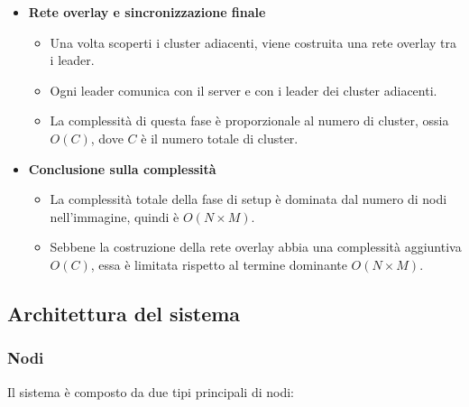 \documentclass[12pt, a4paper]{report}
\begin{document}
\begin{itemize}
    \item \textbf{Rete overlay e sincronizzazione finale}
    \begin{itemize}
        \item Una volta scoperti i cluster adiacenti, viene costruita una rete overlay tra i leader.
        \item Ogni leader comunica con il server e con i leader dei cluster adiacenti.
        \item La complessit\`a di questa fase \`e proporzionale al numero di cluster, ossia $O(C)$, dove $C$ \`e il numero totale di cluster.
    \end{itemize}

    \item \textbf{Conclusione sulla complessit\`a}
    \begin{itemize}
        \item La complessit\`a totale della fase di setup \`e dominata dal numero di nodi nell'immagine, quindi \`e $O(N \times M)$.
        \item Sebbene la costruzione della rete overlay abbia una complessit\`a aggiuntiva $O(C)$, essa \`e limitata rispetto al termine dominante $O(N \times M)$.
    \end{itemize}
\end{itemize}

\subsection{Architettura del sistema}

\subsubsection{Nodi}
Il sistema \`e composto da due tipi principali di nodi:
\end{document}
